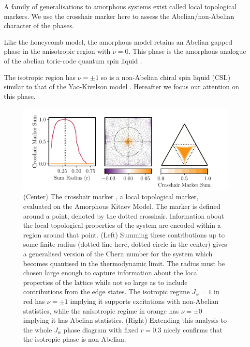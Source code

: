 A family of generalisations to amorphous systems exist \autocite{mitchellAmorphousTopologicalInsulators2018} called local topological markers. We use the crosshair marker \textcite{peru_preprint} here to assess the Abelian/non-Abelian character of the phases.

Like the honeycomb model, the amorphous model retains an Abelian gapped phase in the anisotropic region with \(\nu=0\). This phase is the amorphous analogue of the abelian toric-code quantum spin liquid \autocite{kitaev_fault-tolerant_2003}.

The isotropic region has \(\nu=\pm1\) so is a non-Abelian chiral spin liquid (CSL) similar to that of the Yao-Kivelson model \autocite{yaoExactChiralSpin2007}. Hereafter we focus our attention on this phase.

\begin{figure}
\hypertarget{fig:phase_diagram_chern}{%
\centering
\includegraphics[width=1\textwidth,height=\textheight]{figure_code/amk_chapter/results/phase_diagram_chern/phase_diagram_chern.pdf}
\caption{(Center) The crosshair marker \textcite{peru_preprint}, a local topological marker, evaluated on the Amorphous Kitaev Model. The marker is defined around a point, denoted by the dotted crosshair. Information about the local topological properties of the system are encoded within a region around that point. (Left) Summing these contributions up to some finite radius (dotted line here, dotted circle in the center) gives a generalised version of the Chern number for the system which becomes quantised in the thermodynamic limit. The radius must be chosen large enough to capture information about the local properties of the lattice while not so large as to include contributions from the edge states. The isotropic regime \(J_\alpha = 1\) in red has \(\nu = \pm 1\) implying it supports excitations with non-Abelian statistics, while the anisotropic regime in orange has \(\nu = \pm 0\) implying it has Abelian statistics. (Right) Extending this analysis to the whole \(J_\alpha\) phase diagram with fixed \(r = 0.3\) nicely confirms that the isotropic phase is non-Abelian.}\label{fig:phase_diagram_chern}
}
\end{figure}

